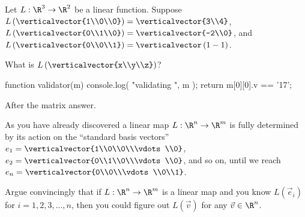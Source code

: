 \documentclass{ximera}
\begin{document}
\begin{question}
  Let $L:\R^3 \to \R^2$ be a linear function.  Suppose $L\left(\verticalvector{1\\0\\0}\right) = \verticalvector{3\\4}$, 
  $L\left(\verticalvector{0\\1\\0}\right) = \verticalvector{-2\\0}$,  and  $L\left(\verticalvector{0\\0\\1}\right) = \verticalvector\left(1\\-1\right)$.
  
  \begin{solution}
    What is $L\left(\verticalvector{x\\y\\z}\right)$?

    \begin{matrix-answer}[name=M]
      function validator(m) {
        console.log( "validating ", m );
        return m[0][0].v == '17';
      }
    \end{matrix-answer}
    
    After the matrix answer.
  \end{solution}

\end{question}

As you have already discovered a linear map $L: \R^n \to \R^m$ is
fully determined by its action on the ``standard basis vectors'' $e_1 =
\verticalvector{1\\0\\0\\\vdots\\0}$, $e_2 = \verticalvector{0\\1\\0\\\vdots\\0}$, and so on, until we reach $e_n = \verticalvector{0\\0\\\vdots\\0\\1}$.

Argue convincingly that if $L:\R^n \to\R^m$ is a linear map and you know $L(\vec{e}_i)$ for $i=1,2,3,...,n$, then you could figure out $L(\vec{v})$ for
any $\vec{v} \in \R^n$.
\begin{free-response}
\end{free-response}
\end{document}
